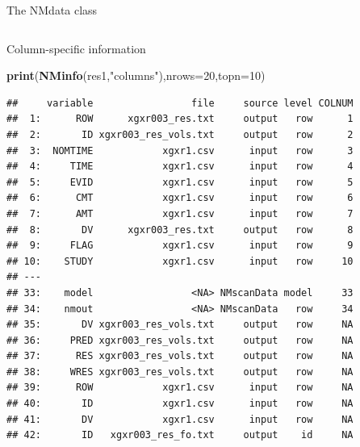 \documentclass[
  8pt,
  ignorenonframetext,
  aspectratio=169]{beamer}
\newenvironment{Shaded}{\begin{snugshade}}{\end{snugshade}}
\newcommand{\DataTypeTok}[1]{\textcolor[rgb]{0.13,0.29,0.53}{#1}}
\newcommand{\DecValTok}[1]{\textcolor[rgb]{0.00,0.00,0.81}{#1}}
\newcommand{\KeywordTok}[1]{\textcolor[rgb]{0.13,0.29,0.53}{\textbf{#1}}}
\newcommand{\NormalTok}[1]{#1}
\newcommand{\StringTok}[1]{\textcolor[rgb]{0.31,0.60,0.02}{#1}}
\begin{document}
\begin{frame}[fragile]{The NMdata class}
\begin{columns}[T]
\begin{column}{0.48\textwidth}
\begin{block}{Column-specific information}
\begin{Shaded}
\begin{Highlighting}[]
\KeywordTok{print}\NormalTok{(}\KeywordTok{NMinfo}\NormalTok{(res1,}\StringTok{"columns"}\NormalTok{),}\DataTypeTok{nrows=}\DecValTok{20}\NormalTok{,}\DataTypeTok{topn=}\DecValTok{10}\NormalTok{)}
\end{Highlighting}
\end{Shaded}

\begin{verbatim}
##     variable                 file     source level COLNUM
##  1:      ROW      xgxr003_res.txt     output   row      1
##  2:       ID xgxr003_res_vols.txt     output   row      2
##  3:  NOMTIME            xgxr1.csv      input   row      3
##  4:     TIME            xgxr1.csv      input   row      4
##  5:     EVID            xgxr1.csv      input   row      5
##  6:      CMT            xgxr1.csv      input   row      6
##  7:      AMT            xgxr1.csv      input   row      7
##  8:       DV      xgxr003_res.txt     output   row      8
##  9:     FLAG            xgxr1.csv      input   row      9
## 10:    STUDY            xgxr1.csv      input   row     10
## ---                                                      
## 33:    model                 <NA> NMscanData model     33
## 34:    nmout                 <NA> NMscanData   row     34
## 35:       DV xgxr003_res_vols.txt     output   row     NA
## 36:     PRED xgxr003_res_vols.txt     output   row     NA
## 37:      RES xgxr003_res_vols.txt     output   row     NA
## 38:     WRES xgxr003_res_vols.txt     output   row     NA
## 39:      ROW            xgxr1.csv      input   row     NA
## 40:       ID            xgxr1.csv      input   row     NA
## 41:       DV            xgxr1.csv      input   row     NA
## 42:       ID   xgxr003_res_fo.txt     output    id     NA
\end{verbatim}
\end{block}
\end{column}
\end{columns}
\end{frame}
\end{document}
